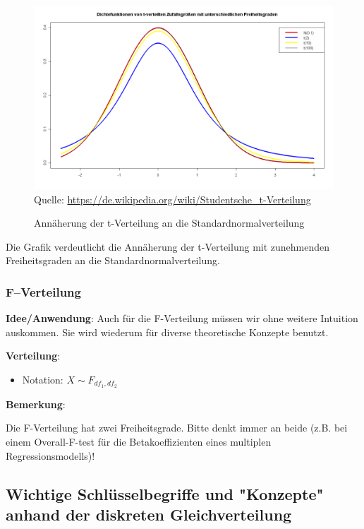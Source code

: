 \documentclass[a4paper]{article}
\newcommand\dangersign[1][2ex]{%
  \renewcommand\stacktype{L}%
  \scaleto{\stackon[1.3pt]{\color{red}$\triangle$}{\tiny !}}{#1}%
}
\begin{document}
\begin{figure}[H] 
\caption{Annäherung der t-Verteilung an die Standardnormalverteilung}\label{Fig:a}
\centering
\includegraphics[scale=0.35]{figures/T-distribution.png}
\footnotesize{Quelle: \url{https://de.wikipedia.org/wiki/Studentsche_t-Verteilung}}
\end{figure}

\noindent Die Grafik verdeutlicht die Annäherung der t-Verteilung mit zunehmenden Freiheitsgraden an die Standardnormalverteilung.

\subsubsection{F--Verteilung}\label{sec:fdistr}

\textbf{Idee/Anwendung}: Auch für die F-Verteilung müssen wir ohne weitere Intuition auskommen. Sie wird wiederum für diverse theoretische Konzepte benutzt. 

\noindent \textbf{Verteilung}:
\begin{itemize}
\item[] Notation: $X \sim F_{df_1,df_2}$

\end{itemize}

\noindent \textbf{Bemerkung}: 

\noindent \dangersign[3ex] Die F-Verteilung hat zwei Freiheitsgrade. Bitte denkt immer an beide (z.B. bei einem Overall-F-test für die Betakoeffizienten eines multiplen Regressionsmodells)!


\subsection{Wichtige Schlüsselbegriffe und "Konzepte" anhand der diskreten Gleichverteilung} \label{sec:concept}
\end{document}
